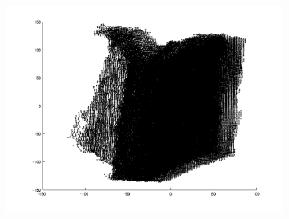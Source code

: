 \begin{figure}
\begin{subfigure}[b]{0.3\textwidth}
		\includegraphics[width=\textwidth]{Images/Book9.png}
		\caption{}
	\end{subfigure}	
	

\end{figure}
